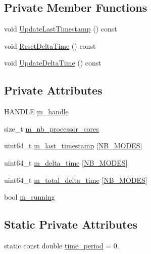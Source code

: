 \subsection*{Private Member Functions}
\begin{DoxyCompactItemize}
\item 
void \hyperlink{classmage_1_1_c_p_u_timer_a1e81db9e1df52fbdf89b042b3611cd80}{Update\+Last\+Timestamp} () const
\item 
void \hyperlink{classmage_1_1_c_p_u_timer_a31f7b301c60a2ea63abfc2d39e8bf96b}{Reset\+Delta\+Time} () const
\item 
void \hyperlink{classmage_1_1_c_p_u_timer_afd5e90ee6e0ad80257bbf6babc440f3b}{Update\+Delta\+Time} () const
\end{DoxyCompactItemize}
\subsection*{Private Attributes}
\begin{DoxyCompactItemize}
\item 
H\+A\+N\+D\+LE \hyperlink{classmage_1_1_c_p_u_timer_a95b8ac18c050ed25293c8a923087369a}{m\+\_\+handle}
\item 
size\+\_\+t \hyperlink{classmage_1_1_c_p_u_timer_ac5fdb38a70c74815231b5efd8d746be1}{m\+\_\+nb\+\_\+processor\+\_\+cores}
\item 
uint64\+\_\+t \hyperlink{classmage_1_1_c_p_u_timer_a6ff1dc5a56461359a699ba8b17d636a8}{m\+\_\+last\+\_\+timestamp} \mbox{[}\hyperlink{classmage_1_1_c_p_u_timer_a5adc0497956723a35534dfeb66fa7789ab63e6023ec0bea89568ebb2b98728b77}{N\+B\+\_\+\+M\+O\+D\+ES}\mbox{]}
\item 
uint64\+\_\+t \hyperlink{classmage_1_1_c_p_u_timer_a7b7710e7f3b165283fad15eb0c93b96a}{m\+\_\+delta\+\_\+time} \mbox{[}\hyperlink{classmage_1_1_c_p_u_timer_a5adc0497956723a35534dfeb66fa7789ab63e6023ec0bea89568ebb2b98728b77}{N\+B\+\_\+\+M\+O\+D\+ES}\mbox{]}
\item 
uint64\+\_\+t \hyperlink{classmage_1_1_c_p_u_timer_aa4b96eea0eb0cc3e5d5a4bb7a343a4f6}{m\+\_\+total\+\_\+delta\+\_\+time} \mbox{[}\hyperlink{classmage_1_1_c_p_u_timer_a5adc0497956723a35534dfeb66fa7789ab63e6023ec0bea89568ebb2b98728b77}{N\+B\+\_\+\+M\+O\+D\+ES}\mbox{]}
\item 
bool \hyperlink{classmage_1_1_c_p_u_timer_a7190afa453085b7bbd7cb76ff6bb62f2}{m\+\_\+running}
\end{DoxyCompactItemize}
\subsection*{Static Private Attributes}
\begin{DoxyCompactItemize}
\item 
static const double \hyperlink{classmage_1_1_c_p_u_timer_a9ff7683150a07f2040b660fc3775337b}{time\+\_\+period} = 0.
\end{DoxyCompactItemize}


